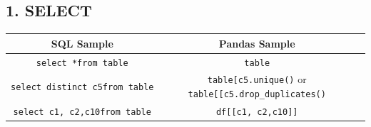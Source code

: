 \documentclass[11pt]{article}
\begin{document}
    \hypertarget{select}{%
\subsection{1. SELECT}\label{select}}

    \begin{longtable}[]{@{}ccc@{}}
\toprule
\begin{minipage}[b]{0.29\columnwidth}\centering
SQL Sample\strut
\end{minipage} & \begin{minipage}[b]{0.34\columnwidth}\centering
Pandas Sample\strut
\end{minipage} & \begin{minipage}[b]{0.29\columnwidth}\centering
\strut
\end{minipage}\tabularnewline
\midrule
\endhead
\begin{minipage}[t]{0.29\columnwidth}\centering
\texttt{select\ *}\texttt{from\ table}\strut
\end{minipage} & \begin{minipage}[t]{0.34\columnwidth}\centering
\texttt{table}\strut
\end{minipage} & \begin{minipage}[t]{0.29\columnwidth}\centering
\strut
\end{minipage}\tabularnewline
\begin{minipage}[t]{0.29\columnwidth}\centering
\texttt{select\ distinct\ c5}\texttt{from\ table}\strut
\end{minipage} & \begin{minipage}[t]{0.34\columnwidth}\centering
\texttt{table{[}\textquotesingle{}c5\textquotesingle{}{]}.unique()} or
\texttt{table{[}{[}\textquotesingle{}c5\textquotesingle{}{]}{]}.drop\_duplicates()}\strut
\end{minipage} & \begin{minipage}[t]{0.29\columnwidth}\centering
\strut
\end{minipage}\tabularnewline
\begin{minipage}[t]{0.29\columnwidth}\centering
\texttt{select\ c1,\ c2,c10}\texttt{from\ table}\strut
\end{minipage} & \begin{minipage}[t]{0.34\columnwidth}\centering
\texttt{df{[}{[}c1,\ c2,c10{]}{]}}\strut
\end{minipage} & \begin{minipage}[t]{0.29\columnwidth}\centering
\strut
\end{minipage}\tabularnewline

\end{longtable}
\end{document}
